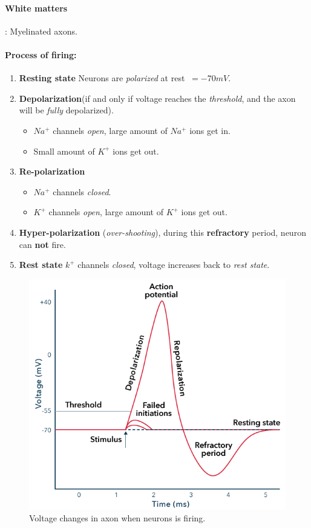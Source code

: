 \documentclass{article}
\begin{document}
	\paragraph{White matters}: Myelinated axons.
	\paragraph{Process of firing:}
	\begin{enumerate}
		\item \textbf{Resting state} Neurons are \emph{polarized} at rest $~= -70 mV$.
		\item \textbf{Depolarization}(if and only if voltage reaches the \emph{threshold}, and the axon will be \emph{fully} depolarized).
		\begin{itemize}
			\item $Na^+$ channels \emph{open}, large amount of $Na^+$ ions get in.
			\item Small amount of $K^+$ ions get out.	
		\end{itemize}
		\item \textbf{Re-polarization}
		\begin{itemize}
			\item $Na^+$ channels \emph{closed}.
			\item $K^+$ channels \emph{open}, large amount of $K^+$ ions get out.
		\end{itemize}
		\item \textbf{Hyper-polarization} (\emph{over-shooting}), during this \textbf{refractory} period, neuron can \textbf{not} fire.
		\item \textbf{Rest state} $k^+$ channels \emph{closed}, voltage increases back to \emph{rest state}. 
	\end{enumerate}
	\begin{figure}
		\includegraphics[width=\linewidth]{pic/voltage.png}
		\caption{Voltage changes in axon when neurons is firing.}	
	\end{figure}
\end{document}
